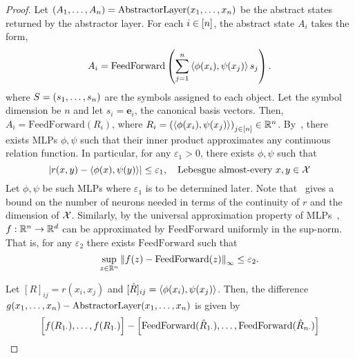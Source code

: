 \begin{proof}
    Let $(A_1, \ldots, A_n) = \mathrm{AbstractorLayer}(x_1, \ldots, x_n)$ be the abstract states returned by the abstractor layer. For each $i \in [n]$,
    the abstract state $A_i$ takes the form,
    \begin{equation*}
        A_i = \mathrm{FeedForward}\left(\sum_{j=1}^{n} \left \langle \phi(x_i), \psi(x_j) \right\rangle s_j\right).
    \end{equation*}
    where $S = (s_1, \ldots, s_n)$ are the symbols assigned to each object. Let the symbol dimension be $n$ and let $s_i = \bm{e}_i$, the canonical basis vectors. Then, $A_i = \mathrm{FeedForward}(R_i)$, where $R_i = {(\left \langle \phi(x_i), \psi(x_j) \right\rangle)}_{j \in [n]} \in \mathbb{R}^n$. By~\citep[Theorem 3.1]{altabaaApproximationRelationFunctions2024}, there exists MLPs $\phi, \psi$ such that their inner product approximates any continuous relation function. In particular, for any $\varepsilon_1 > 0$, there exists $\phi, \psi$ such that
    \begin{equation}\label{eq:approx_proof_r_approx}
        \left\lvert r(x, y) - \left \langle \phi(x), \psi(y) \right\rangle\right\rvert \leq \varepsilon_1, \quad \text{Lebesgue almost-every } x,y \in {\mathcal{X}}
    \end{equation}
    Let $\phi, \psi$ be such MLPs where $\varepsilon_1$ is to be determined later. Note that~\citep{altabaaApproximationRelationFunctions2024} gives a bound on the number of neurons needed in terms of the continuity of $r$ and the dimension of ${\mathcal{X}}$. Similarly, by the universal approximation property of MLPs~\citep[e.g.,][]{cybenkoApproximationSuperpositions1989}, $f: \mathbb{R}^{n} \to \mathbb{R}^{d}$ can be approximated by $\mathrm{FeedForward}$ uniformly in the sup-norm. That is, for any $\varepsilon_2$ there exists $\mathrm{FeedForward}$ such that
    \begin{equation}\label{eq:approx_proof_f_approx}
        \sup_{z \in \mathbb{R}^n} \left\lVert f(z) - \mathrm{FeedForward}(z)\right\rVert_{\infty} \leq \varepsilon_2.
    \end{equation}

    Let $[R]_{ij} = r(x_i, x_j)$ and $[\hat{R}]_{ij} = \left \langle \phi(x_i), \psi(x_j) \right\rangle$. Then, the difference $g(x_1, \ldots, x_n) - \mathrm{AbstractorLayer}(x_1, \ldots, x_n)$ is given by
    \begin{equation}\label{eq:approx_proof_diff}
        \Big[f(R_{1\cdot}), \ldots, f(R_{1\cdot})\Big] - \Big[\mathrm{FeedForward}(\hat{R}_{1\cdot}), \ldots, \mathrm{FeedForward}(\hat{R}_{n\cdot})\Big]
    \end{equation}


\end{proof}
